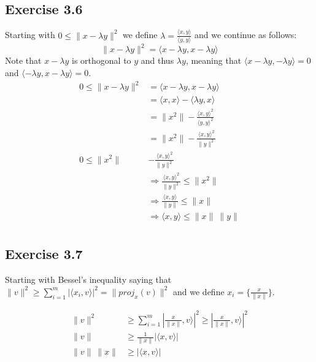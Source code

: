\documentclass[letterpaper,12pt]{article}
\theoremstyle{definition}
\begin{document}
\subsection*{Exercise 3.6}
Starting with  $0\leq\|x-\lambda y\|^{2}$ we define $\lambda = \frac{\langle x,y\rangle }{\langle y,y\rangle }$ and we continue as follows:
\[\|x-\lambda y\|^{2} = \langle x-\lambda y, x-\lambda y\rangle \]
Note that $x-\lambda y$ is orthogonal to $y$ and thus $\lambda y$, meaning that $\langle x-\lambda y,-\lambda y\rangle  = 0$ and $\langle -\lambda y, x-\lambda y\rangle  = 0$. 
 \begin{align*}
0 \leq \|x-\lambda y\|^{2} &= \langle x-\lambda y, x-\lambda y\rangle  \\
&= \langle x,x\rangle  - \langle \lambda y, x\rangle  \\
&= \| x^{2} \| - \frac{\langle x,y\rangle ^{2}}{\langle y,y\rangle ^{2}} \\
&= \| x^{2} \| - \frac{\langle x,y\rangle ^{2}}{\|y\|^{2}} \\
0 \leq \| x^{2} \| &- \frac{\langle x,y\rangle ^{2}}{\|y\|^{2}} \\
&\Rightarrow \frac{\langle x,y\rangle ^{2}}{\|y\|^{2}} \leq \| x^{2} \| \\
&\Rightarrow \frac{\langle x,y\rangle }{\|y\|} \leq \| x \| \\
&\Rightarrow \langle x,y\rangle  \leq \| x \| ~\| y \| \\
\end{align*}

\subsection*{Exercise 3.7}
Starting with Bessel's inequality saying that $ \|v\|^{2} \geq \sum_{i=1}^{m} |{\langle x_{i},v\rangle }|^{2} = \| proj_{x}(v)\|^{2}$ and we define $x_{i} = \{ \frac{x}{\|x\|} \}$. 

\begin{align*}
\|v\|^{2} &\geq \sum_{i=1}^{m} |{\frac{x}{\|x\|},v\rangle }|^{2} \geq |{\frac{x}{\|x\|},v\rangle }|^{2} \\
\|v\| &\geq \frac{1}{\|x\|}|\langle x,v\rangle | \\
\|v\|~\|x\| &\geq |\langle x,v\rangle | \\
\end{align*}
\end{document}
